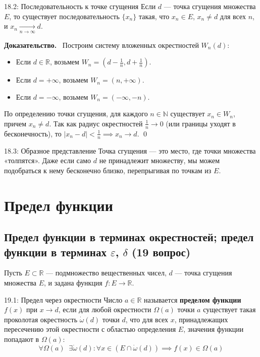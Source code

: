 \documentclass[a4paper,12pt]{article}
\newcommand{\myproof}{\textbf{Доказательство.}\ }
\begin{document}
	\begin{theorembox}{18.2: Последовательность к точке сгущения}
		Если $d$ — точка сгущения множества $E$, то существует последовательность $\{x_n\}$ такая, что $x_n \in E$, $x_n \neq d$ для всех $n$, и $x_n \xrightarrow[n \to \infty]{} d$.
	\end{theorembox}
	
	\myproof
	Построим систему вложенных окрестностей $W_n(d)$:
	\begin{itemize}
		\item Если $d \in \mathbb{R}$, возьмем $W_n = (d - \frac{1}{n}, d + \frac{1}{n})$.
		\item Если $d = +\infty$, возьмем $W_n = (n, +\infty)$.
		\item Если $d = -\infty$, возьмем $W_n = (-\infty, -n)$.
	\end{itemize}
	По определению точки сгущения, для каждого $n \in \mathbb{N}$ существует $x_n \in W_n$, причем $x_n \neq d$. Так как радиус окрестностей $\frac{1}{n} \to 0$ (или границы уходят в бесконечность), то $|x_n - d| < \frac{1}{n} \implies x_n \to d$. \qed
	
	\vspace{0.5cm}
	\begin{notebook}{18.3: Образное представление}
		Точка сгущения — это место, где точки множества «толпятся». Даже если само $d$ не принадлежит множеству, мы можем подобраться к нему бесконечно близко, перепрыгивая по точкам из $E$.
	\end{notebook}
	
	
	
	
	
	
	
	\newpage
	\section{Предел функции}
	
	\subsection{Предел функции в терминах окрестностей; предел функции в терминах $\varepsilon$, $\delta$ (19 вопрос)}
	
	Пусть $E \subset \mathbb{R}$ — подмножество вещественных чисел, $d$ — точка сгущения множества $E$, и задана функция $f \colon E \to \mathbb{R}$.
	
	\begin{definitionbox}{19.1: Предел через окрестности}
		Число $a \in \mathbb{R}$ называется \textbf{пределом функции} $f(x)$ при $x \to d$, если для любой окрестности $\Omega(a)$ точки $a$ существует такая проколотая окрестность $\dot{\omega}(d)$ точки $d$, что для всех $x$, принадлежащих пересечению этой окрестности с областью определения $E$, значения функции попадают в $\Omega(a)$:
		\[
		\forall \Omega(a) \;\; \exists \dot{\omega}(d) \colon \forall x \in (E \cap \dot{\omega}(d)) \implies f(x) \in \Omega(a)
		\]
	\end{definitionbox}
	
\end{document}
